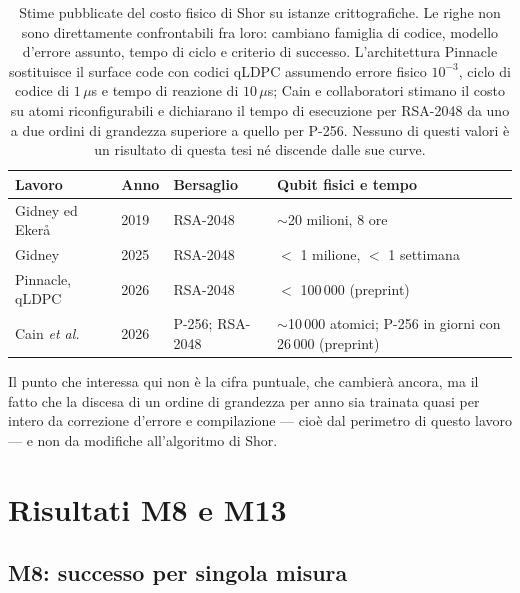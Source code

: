 \begin{onehalfspace}
\begin{table}[H]
\centering
\small
\begin{tabular}{p{}p{}p{}p{}}
\toprule
\textbf{Lavoro} & \textbf{Anno} & \textbf{Bersaglio} & \textbf{Qubit fisici e tempo} \\
\midrule
Gidney ed Eker\aa{}~\cite{gidney2021} & 2019 & RSA-2048 & $\sim$20 milioni, 8 ore \\
Gidney~\cite{gidney2025} & 2025 & RSA-2048 & $<$ 1 milione, $<$ 1 settimana \\
Pinnacle, qLDPC~\cite{pinnacle2026} & 2026 & RSA-2048 & $<$ 100\,000 (preprint) \\
Cain \emph{et al.}~\cite{cain2026} & 2026 & P-256; RSA-2048 & $\sim$10\,000 atomici; P-256 in giorni con 26\,000 (preprint) \\
\bottomrule
\end{tabular}
\caption[Traiettoria delle stime di risorsa per Shor su scala crittografica]{Stime pubblicate del costo fisico di Shor su istanze crittografiche. Le righe non sono direttamente confrontabili fra loro: cambiano famiglia di codice, modello d'errore assunto, tempo di ciclo e criterio di successo. L'architettura Pinnacle sostituisce il surface code con codici qLDPC assumendo errore fisico $10^{-3}$, ciclo di codice di $1\,\mu$s e tempo di reazione di $10\,\mu$s; Cain e collaboratori stimano il costo su atomi riconfigurabili e dichiarano il tempo di esecuzione per RSA-2048 da uno a due ordini di grandezza superiore a quello per P-256. Nessuno di questi valori \`e un risultato di questa tesi n\'e discende dalle sue curve.}
\label{tab:traiettoria_risorse}
\end{table}

Il punto che interessa qui non \`e la cifra puntuale, che cambier\`a ancora, ma il fatto che la discesa di un ordine di grandezza per anno sia trainata quasi per intero da correzione d'errore e compilazione --- cio\`e dal perimetro di questo lavoro --- e non da modifiche all'algoritmo di Shor.

\section{Risultati M8 e M13}
\label{sec:risultati_logico}

\subsection*{M8: successo per singola misura}


\end{onehalfspace}
